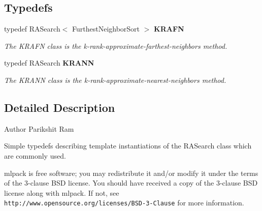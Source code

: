 \subsection*{Typedefs}
\begin{DoxyCompactItemize}
\item 
typedef R\+A\+Search$<$ Furthest\+Neighbor\+Sort $>$ \textbf{ K\+R\+A\+FN}
\begin{DoxyCompactList}\small\item\em The K\+R\+A\+FN class is the k-\/rank-\/approximate-\/farthest-\/neighbors method. \end{DoxyCompactList}\item 
typedef R\+A\+Search \textbf{ K\+R\+A\+NN}
\begin{DoxyCompactList}\small\item\em The K\+R\+A\+NN class is the k-\/rank-\/approximate-\/nearest-\/neighbors method. \end{DoxyCompactList}\end{DoxyCompactItemize}


\subsection{Detailed Description}
\begin{DoxyAuthor}{Author}
Parikshit Ram
\end{DoxyAuthor}
Simple typedefs describing template instantiations of the R\+A\+Search class which are commonly used.

mlpack is free software; you may redistribute it and/or modify it under the terms of the 3-\/clause B\+SD license. You should have received a copy of the 3-\/clause B\+SD license along with mlpack. If not, see {\tt http\+://www.\+opensource.\+org/licenses/\+B\+S\+D-\/3-\/\+Clause} for more information. 